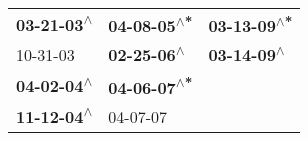 \begin{supertabular}{lll}
 \textbf{03-21-03\textsuperscript{$\wedge$}} &  \textbf{04-08-05\textsuperscript{$\wedge$*}} &  \textbf{03-13-09\textsuperscript{$\wedge$*}} \\
                  10-31-03\textsuperscript{} &   \textbf{02-25-06\textsuperscript{$\wedge$}} &   \textbf{03-14-09\textsuperscript{$\wedge$}} \\
 \textbf{04-02-04\textsuperscript{$\wedge$}} &  \textbf{04-06-07\textsuperscript{$\wedge$*}} &                                               \\
 \textbf{11-12-04\textsuperscript{$\wedge$}} &                    04-07-07\textsuperscript{} &                                               \\
\end{supertabular}
